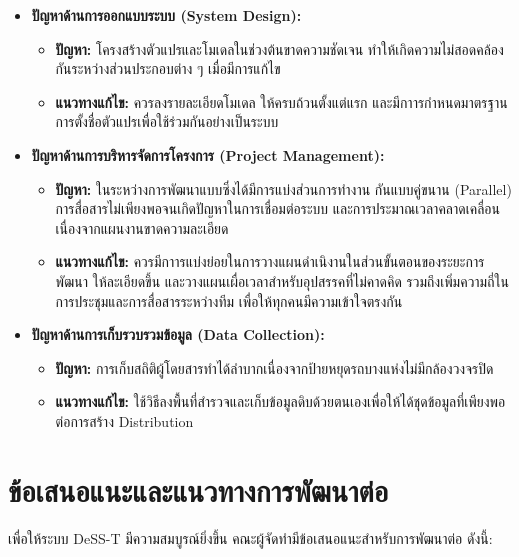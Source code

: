 \begin{itemize}
    \item \textbf{ปัญหาด้านการออกแบบระบบ (System Design):}
    \begin{itemize}
        \item \textbf{ปัญหา:} โครงสร้างตัวแปรและโมเดลในช่วงต้นขาดความชัดเจน 
        ทำให้เกิดความไม่สอดคล้องกันระหว่างส่วนประกอบต่าง ๆ เมื่อมีการแก้ไข
        \item \textbf{แนวทางแก้ไข:} ควรลงรายละเอียดโมเดล ให้ครบถ้วนตั้งแต่แรก 
        และมีกาารกำหนดมาตรฐานการตั้งชื่อตัวแปรเพื่อใช้ร่วมกันอย่างเป็นระบบ
    \end{itemize}
    \item \textbf{ปัญหาด้านการบริหารจัดการโครงการ (Project Management):}
    \begin{itemize}
        \item \textbf{ปัญหา:} ในระหว่างการพัฒนาแบบซึ่งได้มีการแบ่งส่วนการทำงาน
        กันแบบคู่ขนาน (Parallel) การสื่อสารไม่เพียงพอจนเกิดปัญหาในการเชื่อมต่อระบบ 
        และการประมาณเวลาคลาดเคลื่อนเนื่องจากแผนงานขาดความละเอียด
        \item \textbf{แนวทางแก้ไข:} ควรมีกาารแบ่งย่อยในการวางแผนดำเนิงานในส่วนขั้นตอนของระยะการพัฒนา
        ให้ละเอียดขึ้น และวางแผนเผื่อเวลาสำหรับอุปสรรคที่ไม่คาดคิด รวมถึงเพิ่มความถี่ในการประชุมและการสื่อสารระหว่างทีม
        เพื่อให้ทุกคนมีความเข้าใจตรงกัน
    \end{itemize}
    \item \textbf{ปัญหาด้านการเก็บรวบรวมข้อมูล (Data Collection):}
    \begin{itemize}
        \item \textbf{ปัญหา:} การเก็บสถิติผู้โดยสารทำได้ลำบากเนื่องจากป้ายหยุดรถบางแห่งไม่มีกล้องวงจรปิด
        \item \textbf{แนวทางแก้ไข:} ใช้วิธีลงพื้นที่สำรวจและเก็บข้อมูลดิบด้วยตนเองเพื่อให้ได้ชุดข้อมูลที่เพียงพอ
        ต่อการสร้าง Distribution 
    \end{itemize}
\end{itemize}

\section{ข้อเสนอแนะและแนวทางการพัฒนาต่อ}
เพื่อให้ระบบ DeSS-T มีความสมบูรณ์ยิ่งขึ้น คณะผู้จัดทำมีข้อเสนอแนะสำหรับการพัฒนาต่อ ดังนี้:

